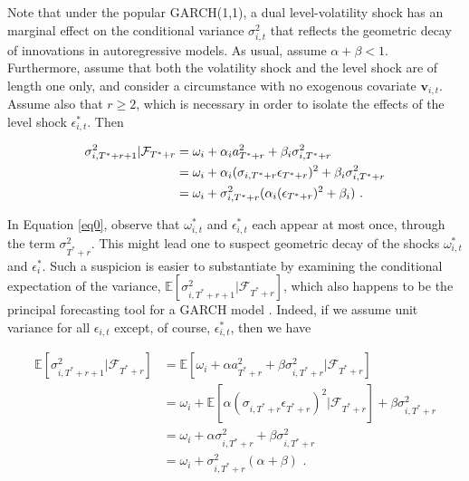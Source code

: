 \documentclass[11pt,3p,review,authoryear]{elsarticle}
\newcommand{\x}{\textbf{v}}
\theoremstyle{definition}
\begin{document}
Note that under the popular GARCH(1,1), a dual level-volatility shock has an marginal effect on the conditional variance $\sigma^{2}_{i,t}$ that reflects the geometric decay of innovations in autoregressive models.  As usual, assume $\alpha+\beta < 1$.  Furthermore, assume that both the volatility shock and the level shock are of length one only, and consider a circumstance with no exogenous covariate $\x_{i,t}$. Assume also that $r\geq 2$, which is necessary in order to isolate the effects of the level shock $\epsilon^{*}_{i,t}$.  Then

\begin{align}
\sigma^{2}_{i,T^{*}+r+1} | \mathcal{F}_{T^{*}+r} & = \omega_{i} + \alpha_{i} a_{T^{*}+r}^{2} + \beta_{i}\sigma^{2}_{i,T^{*}+r} \label{eq0}\\
& = \omega_{i} + \alpha_{i}(\sigma_{i,T^{*}+r}\epsilon_{T^{*}+r})^{2} + \beta_{i}\sigma^{2}_{i,T^{*}+r}\notag \\
& = \omega_{i} + \sigma^{2}_{i,T^{*}+r}(\alpha_{i} (\epsilon_{T^{*}+r})^{2} + \beta_{i}) \text{ .}\notag 
\end{align}

In Equation \eqref{eq0}, observe that $\omega_{i,t}^{*}$ and $\epsilon^{*}_{i,t}$ each appear at most once, through the term $\sigma^{2}_{T^{*}+r}$.  This might lead one to suspect  geometric decay of the shocks $\omega_{i,t}^{*}$ and $\epsilon^{*}_{i}$.  Such a suspicion is easier to substantiate by examining the conditional expectation of the variance, $\mathbb{E}[ \sigma^{2}_{i,T^{*}+r+1} |\mathcal{F}_{T^{*}+r}]$, which also happens to be the principal forecasting tool for a GARCH model \citep{zivot2009practical}.  Indeed, if we assume unit variance for all $\epsilon_{i,t}$ except, of course, $\epsilon^{*}_{i,t}$, then we have

\begin{align*}
\mathbb{E}[ \sigma^{2}_{i,T^{*}+r+1} |\mathcal{F}_{T^{*}+r}] & = \mathbb{E}[\omega_{i} + \alpha a_{T^{*}+r}^{2} + \beta\sigma^{2}_{i,T^{*}+r} |\mathcal{F}_{T^{*}+r}] \\
& = \omega_{i} + \mathbb{E}[\alpha(\sigma_{i,T^{*}+r}\epsilon_{T^{*}+r})^{2} |\mathcal{F}_{T^{*}+r}] + \beta\sigma^{2}_{i,T^{*}+r} \\
& = \omega_{i} + \alpha\sigma_{i,T^{*}+r}^{2} + \beta\sigma^{2}_{i,T^{*}+r} \tag{Due to the unit variance assumption}\\
& = \omega_{i} + \sigma^{2}_{i,T^{*}+r}(\alpha + \beta) \text{ .} \\
\end{align*}
\end{document}
